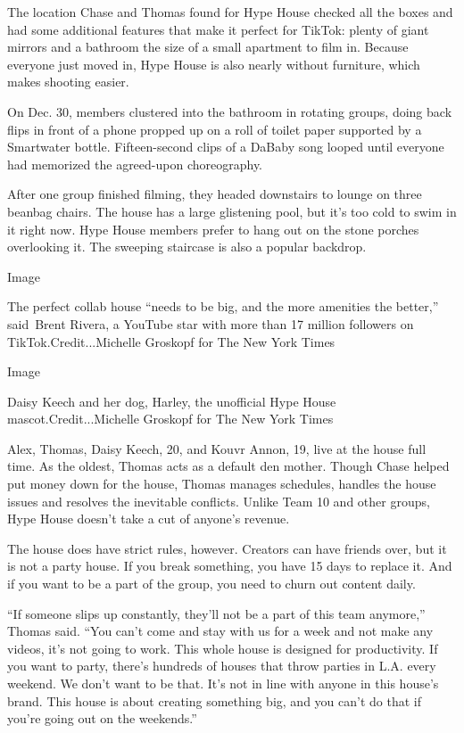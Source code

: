 The location Chase and Thomas found for Hype House checked all the boxes
and had some additional features that make it perfect for TikTok: plenty
of giant mirrors and a bathroom the size of a small apartment to film
in. Because everyone just moved in, Hype House is also nearly without
furniture, which makes shooting easier.

On Dec. 30, members clustered into the bathroom in rotating groups,
doing back flips in front of a phone propped up on a roll of toilet
paper supported by a Smartwater bottle. Fifteen-second clips of a DaBaby
song looped until everyone had memorized the agreed-upon choreography.

After one group finished filming, they headed downstairs to lounge on
three beanbag chairs. The house has a large glistening pool, but it's
too cold to swim in it right now. Hype House members prefer to hang out
on the stone porches overlooking it. The sweeping staircase is also a
popular backdrop.

Image

The perfect collab house ``needs to be big, and the more amenities the
better,'' said~Brent Rivera, a YouTube star with more than 17 million
followers on TikTok.Credit...Michelle Groskopf for The New York Times

Image

Daisy Keech and her dog, Harley, the unofficial Hype House
mascot.Credit...Michelle Groskopf for The New York Times

Alex, Thomas, Daisy Keech, 20, and Kouvr Annon, 19, live at the house
full time. As the oldest, Thomas acts as a default den mother. Though
Chase helped put money down for the house, Thomas manages schedules,
handles the house issues and resolves the inevitable conflicts. Unlike
Team 10 and other groups, Hype House doesn't take a cut of anyone's
revenue.

The house does have strict rules, however. Creators can have friends
over, but it is not a party house. If you break something, you have 15
days to replace it. And if you want to be a part of the group, you need
to churn out content daily.

``If someone slips up constantly, they'll not be a part of this team
anymore,'' Thomas said. ``You can't come and stay with us for a week and
not make any videos, it's not going to work. This whole house is
designed for productivity. If you want to party, there's hundreds of
houses that throw parties in L.A. every weekend. We don't want to be
that. It's not in line with anyone in this house's brand. This house is
about creating something big, and you can't do that if you're going out
on the weekends.''

